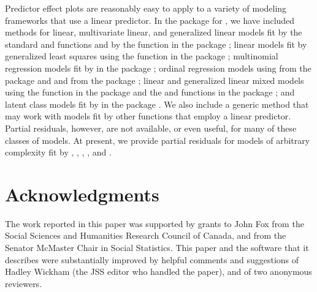 \documentclass[article]{jss}
\begin{document}
Predictor effect plots are reasonably easy to apply to a variety of
modeling frameworks that use a linear predictor.  In the 
package for , we have included methods for linear,
multivariate linear, and generalized linear models fit by the standard
 and  functions and by the  function
in the  package \citep{Lumley04}; linear models fit by
generalized least squares using the  function in the
 package \citep{Pinheiro16}; multinomial regression models
fit by  in the  package
\citep{VenablesRipley02}; ordinal regression models using 
from the  package \citep{VenablesRipley02} and 
and  from the  package \citep{Christensen15};
linear and generalized linear mixed models using the 
function in the  package \citep{Pinheiro16} and the
 and  functions in the  package
\citep{Bates15}; and latent class models fit by  in the
 package \citep{Linzer11}. We also include a generic method
that may work with models fit by other functions that employ a linear
predictor. Partial residuals, however, are not available, or even
useful, for many of these classes of models.  At present, we provide
partial residuals for models of arbitrary complexity fit by ,
, , , and .

\section*{Acknowledgments}

The work reported in this paper was supported by grants to John Fox
from the Social Sciences and Humanities Research Council of Canada,
and from the Senator McMaster Chair in Social Statistics. This paper
and the software that it describes were substantially improved by
helpful comments and suggestions of Hadley Wickham (the JSS editor who
handled the paper), and of two anonymous reviewers.


\end{document}
